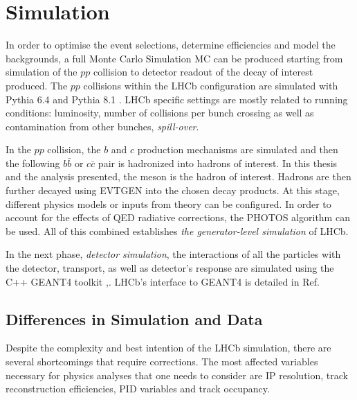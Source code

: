 \section{Simulation }
\label{simulationchap}
In order to optimise the event selections, determine efficiencies and model the backgrounds, a full Monte Carlo Simulation \Gls{MC} can be produced starting from simulation of the $pp$ collision to detector readout of the decay of interest produced. 
The $pp$ collisions within the \Gls{LHCb} configuration \cite{Belyaev:2011zza} are simulated with Pythia 6.4 \cite{pythia6} and Pythia 8.1 \cite{pythia8}. \Gls{LHCb} specific settings are mostly related to running conditions: luminosity, number of collisions per bunch crossing as well as contamination from other bunches, \textit{spill-over}. 

In the $pp$ collision, the $b$ and $c$ production mechanisms are simulated and then the following $b\bar{b}$ or $c\bar{c}$ pair is hadronized into hadrons of interest. In this thesis and the analysis presented, the \Bp meson is the hadron of interest. Hadrons are then further decayed using EVTGEN \cite{Lange:2001uf} into the chosen decay products. At this stage, different physics models or inputs from theory can be configured. %
In order to account for the effects of \Gls{QED} radiative corrections, the PHOTOS \cite{photos} algorithm can be used. All of this combined establishes \textit{the generator-level simulation} of LHCb.


In the next phase, \textit{detector simulation}, the interactions of all the particles with the detector, transport, as well as detector's response are simulated using the C++ GEANT4 toolkit \cite{Geant4},\cite{Agostinelli:2002hh}. \Gls{LHCb}'s interface to GEANT4 is detailed in Ref\cite{Clemencic:2011zza}. 

\subsection{Differences in Simulation and Data}
\label{detpid}
Despite the complexity and best intention of the \Gls{LHCb} simulation, there are several shortcomings that require corrections.
The most affected variables necessary for physics analyses that one needs to consider are \Gls{IP} resolution, track reconstruction efficiencies, \Gls{PID} variables and track occupancy.

